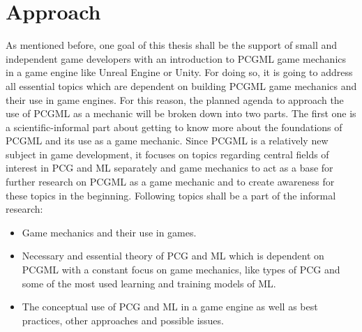 \documentclass[MGS,Master,english]{twbook}%
\begin{document}
\section{Approach}
As mentioned before, one goal of this thesis shall be the support of small and independent game developers with an introduction to \ac{PCGML} game mechanics in a game engine like Unreal Engine or Unity. For doing so, it is going to address all essential topics which are dependent on building \ac{PCGML} game mechanics and their use in game engines. For this reason, the planned agenda to approach the use of \ac{PCGML} as a mechanic will be broken down into two parts. The first one is a scientific-informal part about getting to know more about the foundations of \ac{PCGML} and its use as a game mechanic. Since \ac{PCGML} is a relatively new subject in game development, it focuses on topics regarding central fields of interest in \ac{PCG} and \ac{ML} separately and game mechanics to act as a base for further research on \ac{PCGML} as a game mechanic and to create awareness for these topics in the beginning. Following topics shall be a part of the informal research:
\begin{itemize}
	\item Game mechanics and their use in games.
	\item Necessary and essential theory of \ac{PCG} and \ac{ML} which is dependent on \ac{PCGML} with a constant focus on game mechanics, like types of \ac{PCG} and some of the most used learning and training models of \ac{ML}.
	\item The conceptual use of \ac{PCG} and \ac{ML} in a game engine as well as best practices, other approaches and possible issues.
\end{itemize}
\end{document}
